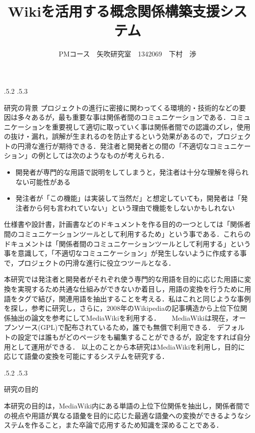 \documentclass[uplatex]{jsarticle}
\title{\vspace{-14mm}Wikiを活用する概念関係構築支援システム}
\author{PMコース　矢吹研究室　1342069　下村　渉}
\date{}%
\makeatletter
\renewcommand{\section}{%
    \if@slide\clearpage\fi
    \@startsection{section}{1}{\z@}%
    {\Cvs \@plus.5\Cdp \@minus.2\Cdp}%
    {.5\Cvs \@plus.3\Cdp}%
    {\normalfont\raggedright}}
\makeatother
\begin{document}
\maketitle
\section{研究の背景}
プロジェクトの進行に密接に関わってくる環境的・技術的などの要因は多々あるが，最も重要な事は関係者間のコミュニケーションである．コミュニケーションを重要視して適切に取っていく事は関係者間での認識のズレ，使用の抜け・漏れ，誤解が生まれるのを防止するという効果があるので，プロジェクトの円滑な進行が期待できる．発注者と開発者との間の「不適切なコミュニケーション」の例としては次のようなものが考えられる．
\begin{itemize}
\item 開発者が専門的な用語で説明をしてしまうと，発注者は十分な理解を得られない可能性がある
\item 発注者が「この機能」は実装して当然だ」と想定していても，開発者は「発注者から何も言われていない」という理由で機能をしないかもしれない
\end{itemize}
仕様書や設計書，計画書などのドキュメントを作る目的の一つとしては「関係者間のコミュニケーションツールとして利用するため」という事である．これらのドキュメントは「関係者間のコミュニケーションツールとして利用する」という事を意識して，「不適切なコミュニケーション」が発生しないように作成する事で，プロジェクトの円滑な進行に役立つツールとなる\cite{a}．

本研究では発注者と開発者がそれぞれ使う専門的な用語を目的に応じた用語に変換を実現するため共通な仕組みができないか着目し，用語の変換を行うために用語をタグで結び，関連用語を抽出することを考える．私はこれと同じような事例を探し，参考に研究し，さらに，2008年のWikipediaの記事構造から上位下位関係抽出の論文を参考にしてMediaWikiを利用する\cite{b}．
　
MediaWikiは現在，オープンソース(GPL)で配布されているため，誰でも無償で利用できる\cite{c}．
デフォルトの設定では誰もがどのページをも編集することができるが，設定をすれば自分用として運用ができる\cite{d}．
以上のことから本研究はMediaWikiを利用し，目的に応じて語彙の変換を可能にするシステムを研究する．





\section{研究の目的}

本研究の目的は，MediaWiki内にある単語の上位下位関係を抽出し，関係者間での視点や用語が異なる語彙を目的に応じた最適な語彙への変換ができるようなシステムを作ること，また卒論で応用するため知識を深めることである．
\end{document}

